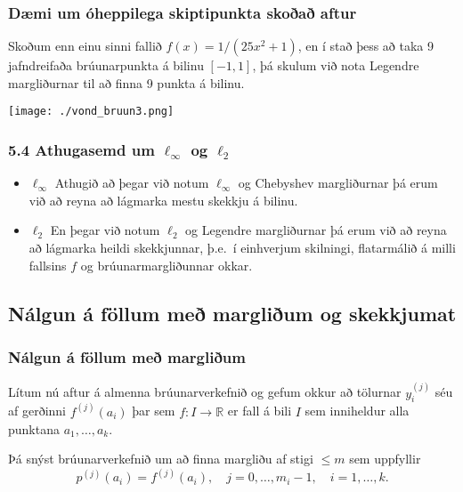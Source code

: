 \documentclass[icelandic,a4paper,12pt]{article}
\newcommand{\R}{{\mathbb  R}}
\begin{document}
 

 \subsubsection{Dæmi um óheppilega skiptipunkta skoðað aftur}
Skoðum enn einu sinni fallið 
$f(x) = 1/(25x^2+1)$, en í stað þess að taka 9  jafndreifaða brúunarpunkta
á bilinu $[-1,1]$, þá skulum við nota Legendre margliðurnar til að finna 9
punkta á bilinu.  
\begin{center}
 \texttt{[image: ./vond\_bruun3.png]}
\end{center}




\subsubsection{5.4 Athugasemd um $\ell_\infty$ og $\ell_2$}
\begin{itemize}
\item $\ell_\infty$
 Athugið að þegar við notum $\ell_\infty$ og Chebyshev margliðurnar þá erum við 
 að reyna að lágmarka mestu skekkju á bilinu. 
 \pause
 
\item $\ell_2$
 En þegar við notum $\ell_2$ og Legendre margliðurnar þá erum við að reyna að 
 lágmarka heildi skekkjunnar, þ.e.~í einhverjum skilningi, flatarmálið á milli 
 fallsins $f$ og brúunarmargliðunnar okkar.
 
\end{itemize}

\subsection{Nálgun á föllum með margliðum og skekkjumat}

\subsubsection{Nálgun á föllum með margliðum} 
Lítum nú aftur á almenna brúunarverkefnið og
gefum okkur að  tölurnar $y_i^{(j)}$ séu af gerðinni $f^{(j)}(a_i)$ 
þar sem $f : I \to \R$ er fall á bili $I$ sem inniheldur alla
punktana  $a_1, \ldots, a_k$.

\pause
\smallskip
Þá snýst brúunarverkefnið um að finna
margliðu  af stigi $\leq m$ sem uppfyllir
\begin{equation*}
  p^{(j)}(a_i) = f^{(j)}(a_i), \quad
  j = 0, \ldots, m_i-1, \quad i = 1, \ldots, k.
\end{equation*}
\end{document}
